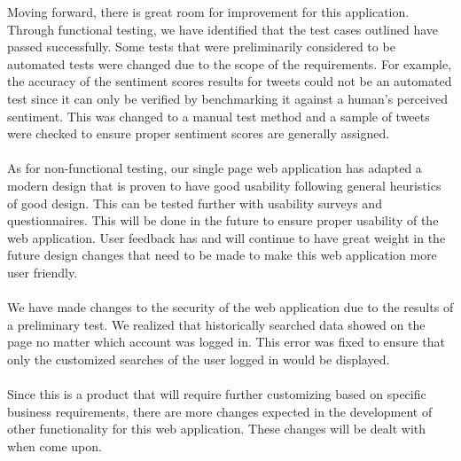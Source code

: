 \documentclass[12pt]{article}
\begin{document}
Moving forward, there is great room for improvement for this application. Through functional testing, we have identified that the test cases outlined have passed successfully. Some tests that were preliminarily considered to be automated tests were changed due to the scope of the requirements. For example, the accuracy of the sentiment scores results for tweets could not be an automated test since it can only be verified by benchmarking it against a human's perceived sentiment. This was changed to a manual test method and a sample of tweets were checked to ensure proper sentiment scores are generally assigned.
\\ \\
As for non-functional testing, our single page web application has adapted a modern design that is proven to have good usability following general heuristics of good design. This can be tested further with usability surveys and questionnaires. This will be done in the future to ensure proper usability of the web application. User feedback has and will continue to have great weight in the future design changes that need to be made to make this web application more user friendly.
\\ \\
 We have made changes to the security of the web application due to the results of a preliminary test. We realized that historically searched data showed on the page no matter which account was logged in. This error was fixed to ensure that only the customized searches of the user logged in would be displayed.
\\ \\
Since this is a product that will require further customizing based on specific business requirements, there are more changes expected in the development of other functionality for this web application. These changes will be dealt with when come upon.
\end{document}
